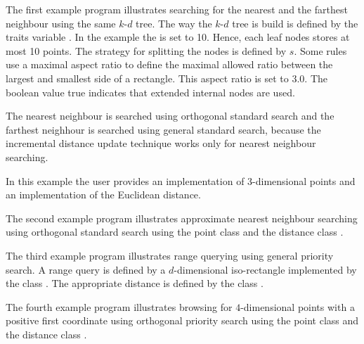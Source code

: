 The first example program illustrates searching for the nearest and the farthest neighbour using the
same $k$-$d$ tree.
The way the $k$-$d$ tree is build is defined by the traits variable .
In the example the  is set to 10.
Hence, each leaf nodes stores at most 10 points.
The strategy for splitting the nodes is defined by $s$.
Some rules use a maximal aspect ratio to define
the maximal allowed ratio between the largest and smallest side of a rectangle.
This aspect ratio is set to 3.0. The boolean value true indicates that
extended internal nodes are used.

The nearest neighbour is searched using orthogonal standard search and
the farthest neighhour is searched using general standard search, because the
incremental distance update technique works only for nearest neighbour searching.

In this example the user provides an implementation of 3-dimensional points and an
implementation of the Euclidean distance.


The second example program illustrates approximate nearest neighbour searching
using orthogonal standard search using the point class 
and the distance class .
 

The third example program illustrates range querying using general priority search.
A range query is defined by a $d$-dimensional iso-rectangle implemented by
the class . The appropriate distance is defined by
the class .


The fourth example program illustrates browsing for $4$-dimensional points with
a positive first coordinate using orthogonal priority search
using the point class 
and the distance class .
 



